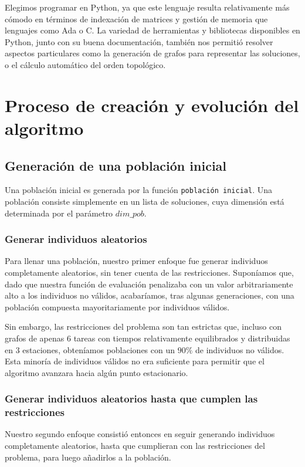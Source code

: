 \documentclass[12pt,a4paper]{report}
\begin{document}
Elegimos programar en Python, ya que este lenguaje resulta relativamente más cómodo en términos de indexación de matrices y gestión de memoria que lenguajes como Ada o C. La variedad de herramientas y bibliotecas disponibles en Python, junto con su buena documentación, también nos permitió resolver aspectos particulares como la generación de grafos para representar las soluciones, o el cálculo automático del orden topológico.


\chapter{Proceso de creación y evolución del algoritmo}

\section{Generación de una población inicial}

Una población inicial es generada por la función \texttt{población inicial}. Una población consiste simplemente en un lista de soluciones, cuya dimensión está determinada por el parámetro $dim\_pob$.

\subsection*{Generar individuos aleatorios}

Para llenar una población, nuestro primer enfoque fue generar individuos completamente aleatorios, sin tener cuenta de las restricciones. Suponíamos que, dado que nuestra función de evaluación penalizaba con un valor arbitrariamente alto a los individuos no válidos, acabaríamos, tras algunas generaciones, con una población compuesta mayoritariamente por individuos válidos.

Sin embargo, las restricciones del problema son tan estrictas que, incluso con grafos de apenas $6$ tareas con tiempos relativamente equilibrados y distribuidas en $3$ estaciones, obteníamos poblaciones con un $90\%$ de individuos no válidos.
Esta minoría de individuos válidos no era suficiente para permitir que el algoritmo avanzara hacia algún punto estacionario.

\subsection*{Generar individuos aleatorios hasta que cumplen las restricciones}

Nuestro segundo enfoque consistió entonces en seguir generando individuos completamente aleatorios, hasta que cumplieran con las restricciones del problema, para luego añadirlos a la población.\\
\end{document}

